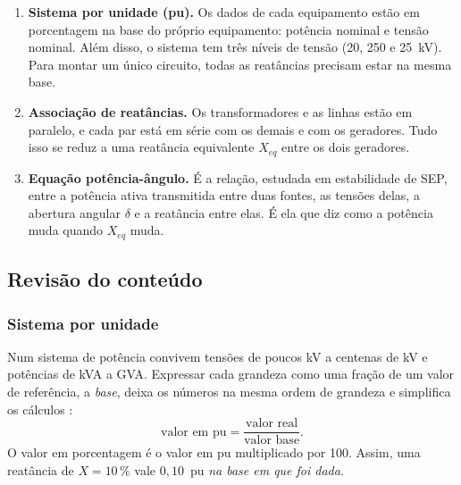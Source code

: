 \documentclass[a4paper,11pt]{article}
\numberwithin{equation}{section}
\numberwithin{figure}{section}
\numberwithin{table}{section}
\newcommand{\passo}[1]{{\color{blue_theme}\bfseries #1}\enspace}
\begin{document}
\begin{enumerate}
  \item \passo{Sistema por unidade (pu).} Os dados de cada equipamento estão
        em porcentagem na base do próprio equipamento: potência nominal e
        tensão nominal. Além disso, o sistema tem três níveis de tensão (20,
        250 e 25~kV). Para montar um único circuito, todas as reatâncias
        precisam estar na mesma base.
  \item \passo{Associação de reatâncias.} Os transformadores e as linhas
        estão em paralelo, e cada par está em série com os demais e com os
        geradores. Tudo isso se reduz a uma reatância equivalente $X_{eq}$
        entre os dois geradores.
  \item \passo{Equação potência-ângulo.} É a relação, estudada em
        estabilidade de SEP, entre a potência ativa transmitida entre duas
        fontes, as tensões delas, a abertura angular $\delta$ e a reatância
        entre elas. É ela que diz como a potência muda quando $X_{eq}$ muda.
\end{enumerate}

\subsection{Revisão do conteúdo}

\subsubsection{Sistema por unidade}

Num sistema de potência convivem tensões de poucos kV a centenas de kV e
potências de kVA a GVA. Expressar cada grandeza como uma fração de um valor
de referência, a \emph{base}, deixa os números na mesma ordem de grandeza e
simplifica os cálculos \cite{stevenson1986elementos,bichels2018sep}:
\begin{equation}
  \text{valor em pu} = \frac{\text{valor real}}{\text{valor base}}.
  \label{eq:pu}
\end{equation}
O valor em porcentagem é o valor em pu multiplicado por 100. Assim, uma
reatância de $X = 10\,\%$ vale $0{,}10$~pu \emph{na base em que foi dada}.
\end{document}
